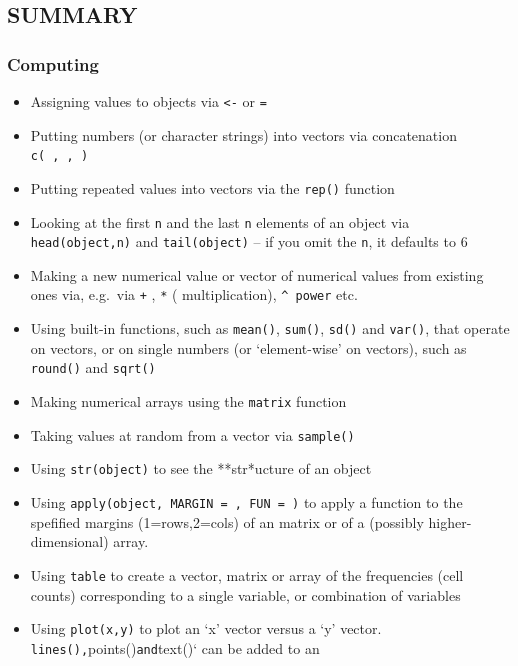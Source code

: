 \documentclass[
]{article}
\begin{document}
\hypertarget{summary}{%
\subsection{SUMMARY}\label{summary}}

\hypertarget{computing}{%
\subsubsection{Computing}\label{computing}}

\begin{itemize}
\item
  Assigning values to objects via \texttt{\textless{}-} or \texttt{=}
\item
  Putting numbers (or character strings) into vectors via concatenation
  \texttt{c(\ ,\ ,\ )}
\item
  Putting repeated values into vectors via the \texttt{rep()} function
\item
  Looking at the first \texttt{n} and the last \texttt{n} elements of an
  object via \texttt{head(object,n)} and \texttt{tail(object)} -- if you
  omit the \texttt{n}, it defaults to 6
\item
  Making a new numerical value or vector of numerical values from
  existing ones via, e.g.~via \texttt{+} , \texttt{*} ( multiplication),
  \texttt{\^{}\ power} etc.
\item
  Using built-in functions, such as \texttt{mean()}, \texttt{sum()},
  \texttt{sd()} and \texttt{var()}, that operate on vectors, or on
  single numbers (or `element-wise' on vectors), such as
  \texttt{round()} and \texttt{sqrt()}
\item
  Making numerical arrays using the \texttt{matrix} function
\item
  Taking values at random from a vector via \texttt{sample()}
\item
  Using \texttt{str(object)} to see the **str*ucture of an object
\item
  Using \texttt{apply(object,\ MARGIN\ =\ ,\ FUN\ =\ )} to apply a
  function to the spefified margins (1=rows,2=cols) of an matrix or of a
  (possibly higher-dimensional) array.
\item
  Using \texttt{table} to create a vector, matrix or array of the
  frequencies (cell counts) corresponding to a single variable, or
  combination of variables
\item
  Using \texttt{plot(x,y)} to plot an `x' vector versus a `y' vector.
  \texttt{lines(),}points()\texttt{and}text()` can be added to an

\end{itemize}
\end{document}
